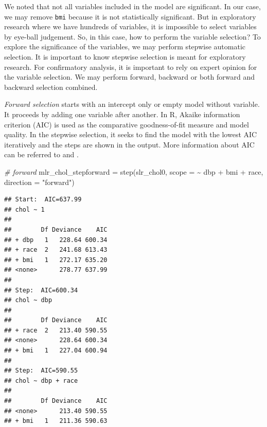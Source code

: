\documentclass[
  10pt,
]{krantz}
\newenvironment{Shaded}{\begin{snugshade}}{\end{snugshade}}
\newcommand{\AttributeTok}[1]{\textcolor[rgb]{0.77,0.63,0.00}{#1}}
\newcommand{\CommentTok}[1]{\textcolor[rgb]{0.56,0.35,0.01}{\textit{#1}}}
\newcommand{\FunctionTok}[1]{\textcolor[rgb]{0.00,0.00,0.00}{#1}}
\newcommand{\NormalTok}[1]{#1}
\newcommand{\OtherTok}[1]{\textcolor[rgb]{0.56,0.35,0.01}{#1}}
\newcommand{\SpecialCharTok}[1]{\textcolor[rgb]{0.00,0.00,0.00}{#1}}
\newcommand{\StringTok}[1]{\textcolor[rgb]{0.31,0.60,0.02}{#1}}
\begin{document}
We noted that not all variables included in the model are significant. In our case, we may remove \texttt{bmi} because it is not statistically significant. But in exploratory research where we have hundreds of variables, it is impossible to select variables by eye-ball judgement. So, in this case, how to perform the variable selection? To explore the significance of the variables, we may perform stepwise automatic selection. It is important to know stepwise selection is meant for exploratory research. For confirmatory analysis, it is important to rely on expert opinion for the variable selection. We may perform forward, backward or both forward and backward selection combined.

\emph{Forward selection} starts with an intercept only or empty model without variable. It proceeds by adding one variable after another. In R, Akaike information criterion (AIC) is used as the comparative goodness-of-fit measure and model quality. In the stepwise selection, it seeks to find the model with the lowest AIC iteratively and the steps are shown in the output. More information about AIC can be referred to \citet{hu2007} and \citet{aic-wiki}.

\begin{Shaded}
\begin{Highlighting}[]
\CommentTok{\# forward}
\NormalTok{mlr\_chol\_stepforward }\OtherTok{=} \FunctionTok{step}\NormalTok{(slr\_chol0, }\AttributeTok{scope =} \SpecialCharTok{\textasciitilde{}}\NormalTok{ dbp }\SpecialCharTok{+}\NormalTok{ bmi }\SpecialCharTok{+}\NormalTok{ race, }
                            \AttributeTok{direction =} \StringTok{"forward"}\NormalTok{)}
\end{Highlighting}
\end{Shaded}

\begin{verbatim}
## Start:  AIC=637.99
## chol ~ 1
## 
##        Df Deviance    AIC
## + dbp   1   228.64 600.34
## + race  2   241.68 613.43
## + bmi   1   272.17 635.20
## <none>      278.77 637.99
## 
## Step:  AIC=600.34
## chol ~ dbp
## 
##        Df Deviance    AIC
## + race  2   213.40 590.55
## <none>      228.64 600.34
## + bmi   1   227.04 600.94
## 
## Step:  AIC=590.55
## chol ~ dbp + race
## 
##        Df Deviance    AIC
## <none>      213.40 590.55
## + bmi   1   211.36 590.63
\end{verbatim}
\end{document}
